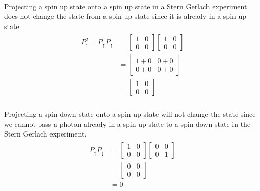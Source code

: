 \documentclass{article}
\begin{document}
\paragraph[short]{} {
    Projecting a spin up state onto a spin up state in a Stern Gerlach experiment does not change the state from a spin up state since it is already in a spin up state
}
\begin{align*}
    \begin{split}
        P_\uparrow^2 = P_\uparrow P_\uparrow &=
        \begin{bmatrix}
            1 & 0 \\
            0 & 0
        \end{bmatrix}
        \begin{bmatrix}
            1 & 0 \\
            0 & 0
        \end{bmatrix} \\
        &= 
        \begin{bmatrix}
            1 + 0 & 0 + 0 \\
            0 + 0 & 0 + 0
        \end{bmatrix}\\
        &= 
        \begin{bmatrix}
            1 & 0 \\
            0 & 0
        \end{bmatrix}
    \end{split}
\end{align*}

\paragraph[short]{} {
    Projecting a spin down state onto a spin up state will not change the state since we cannot pass a photon already in a spin up state to a spin down state in the Stern Gerlach experiment.
}
\begin{align*}
    \begin{split}
        P_\uparrow P_\downarrow &=
        \begin{bmatrix}
            1 & 0 \\
            0 & 0
        \end{bmatrix}
        \begin{bmatrix}
            0 & 0 \\
            0 & 1
        \end{bmatrix} \\
        &=
        \begin{bmatrix}
            0 & 0 \\
            0 & 0
        \end{bmatrix}\\
        &= 0 \\
    \end{split}
\end{align*}
\end{document}
